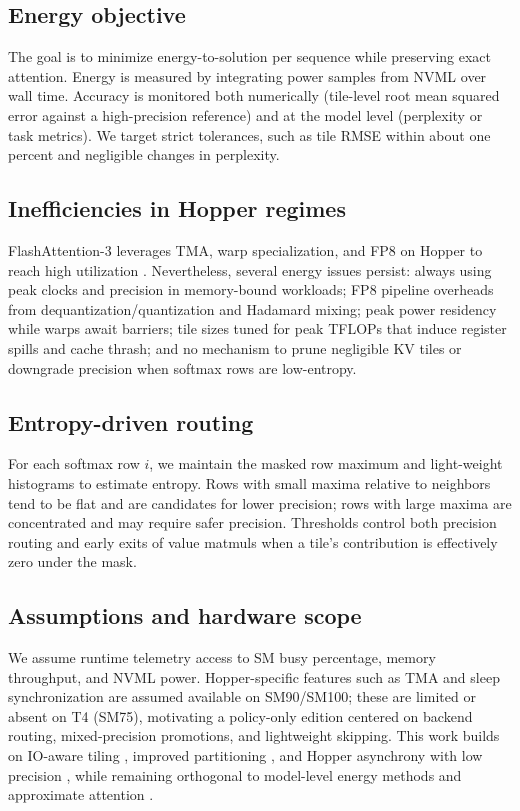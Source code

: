 \documentclass{article}
\begin{document}
\subsection{Energy objective}
The goal is to minimize energy-to-solution per sequence while preserving exact attention. Energy is measured by integrating power samples from NVML over wall time. Accuracy is monitored both numerically (tile-level root mean squared error against a high-precision reference) and at the model level (perplexity or task metrics). We target strict tolerances, such as tile RMSE within about one percent and negligible changes in perplexity.

\subsection{Inefficiencies in Hopper regimes}
FlashAttention-3 leverages TMA, warp specialization, and FP8 on Hopper to reach high utilization \cite{shah-2024-flashattention}. Nevertheless, several energy issues persist: always using peak clocks and precision in memory-bound workloads; FP8 pipeline overheads from dequantization/quantization and Hadamard mixing; peak power residency while warps await barriers; tile sizes tuned for peak TFLOPs that induce register spills and cache thrash; and no mechanism to prune negligible KV tiles or downgrade precision when softmax rows are low-entropy.

\subsection{Entropy-driven routing}
For each softmax row \(i\), we maintain the masked row maximum and light-weight histograms to estimate entropy. Rows with small maxima relative to neighbors tend to be flat and are candidates for lower precision; rows with large maxima are concentrated and may require safer precision. Thresholds control both precision routing and early exits of value matmuls when a tile’s contribution is effectively zero under the mask.

\subsection{Assumptions and hardware scope}
We assume runtime telemetry access to SM busy percentage, memory throughput, and NVML power. Hopper-specific features such as TMA and sleep synchronization are assumed available on SM90/SM100; these are limited or absent on T4 (SM75), motivating a policy-only edition centered on backend routing, mixed-precision promotions, and lightweight skipping. This work builds on IO-aware tiling \cite{dao-2022-flashattention}, improved partitioning \cite{dao-2023-flashattention}, and Hopper asynchrony with low precision \cite{shah-2024-flashattention}, while remaining orthogonal to model-level energy methods and approximate attention \cite{liu-2022-ecoformer,pagliardini-2023-fast,nguyen-2022-fourierformer,rabe-2021-self,hassani-2024-faster,nahshan-2023-linear}.
\end{document}
